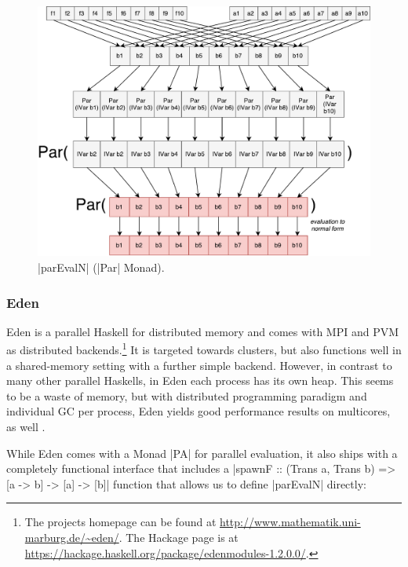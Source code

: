 \begin{figure}[t]
	\includegraphics[scale=0.5]{images/parEvalNParMonad}
	\caption{|parEvalN| (|Par| Monad).}
	\label{fig:parEvalNParMonadImg}
\end{figure}

\subsubsection{Eden}
Eden \cite{eden,Loogen2012} is a parallel Haskell for distributed memory and comes with MPI and PVM as distributed backends.\footnote{The projects homepage can be found at \url{http://www.mathematik.uni-marburg.de/~eden/}. The Hackage page is at \url{https://hackage.haskell.org/package/edenmodules-1.2.0.0/}.} It is targeted towards clusters, but also functions well in a shared-memory setting with a further simple backend. However, in contrast to many other parallel Haskells, in Eden each process has its own heap. This seems to be a waste of memory, but with distributed programming paradigm and individual GC per process, Eden yields good performance results on multicores, as well \cite{arcs-dc,aswad2009low}.

While Eden comes with a Monad |PA| for parallel evaluation, it also ships with a completely functional interface that includes
a |spawnF :: (Trans a, Trans b) => [a -> b] -> [a] -> [b]|
function that
allows us to define |parEvalN| directly:

